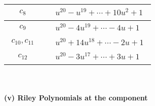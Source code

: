 \documentclass[1p]{elsarticle_modified}
\theoremstyle{definition}
\begin{document}
\begin{tabular}{m{50pt}|m{274pt}}
\hline $$\begin{aligned}c_{8}\end{aligned}$$&$\begin{aligned}
&u^{20}- u^{19}+\cdots+10 u^2+1
\end{aligned}$\\
\hline $$\begin{aligned}c_{9}\end{aligned}$$&$\begin{aligned}
&u^{20}-4 u^{19}+\cdots-4 u+1
\end{aligned}$\\
\hline $$\begin{aligned}c_{10},c_{11}\end{aligned}$$&$\begin{aligned}
&u^{20}+14 u^{18}+\cdots-2 u+1
\end{aligned}$\\
\hline $$\begin{aligned}c_{12}\end{aligned}$$&$\begin{aligned}
&u^{20}-3 u^{17}+\cdots+3 u+1
\end{aligned}$\\
\hline
\end{tabular}\\~\\
\newpage\renewcommand{\arraystretch}{1}
\flushleft \textbf{(v) Riley Polynomials at the component}\newline \\
\end{document}

